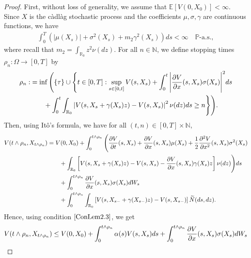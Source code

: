 \documentclass[11pt]{article}
\theoremstyle{theorem}
\theoremstyle{definition}
\newcommand{\bR}{\mathbb{R}}
\newcommand{\1}{{\bf 1}}
\begin{document}
\begin{proof}
 First, without loss of generality, we assume that $\mathbb{E}[V(0, X_0)] < \infty.$ Since $X$ is the c\`adl\`ag stochastic process and the coefficients $\mu, \sigma, \gamma$ are continuous functions, we have
  \begin{align*}
    \int_0^T \left(|\mu (X_s)|+ \sigma^2(X_s) + m_2 \gamma ^2(X_s)\right) ds  < \infty  \quad \mathbb{P} \text{-a.s.},
    \end{align*} 
 where recall that $ m_2= \int_{\bR_0}z^2\nu(d z)$.
For all $n\in \mathbb{N}$, we define stopping times $\rho_n: \Omega \to [0, T]$ by
\begin{align*}
    \rho_n:&= \inf \Bigg(  \{\tau\}\cup \Bigg\{ t\in [0, T]: \sup_{s\in [0, t]} V(s, X_s)+ \int_0^t \Bigg |\dfrac{\partial V}{\partial x}  (s, X_s) \sigma (X_s)\Bigg|^2 ds  \notag \\
    &  \qquad + \int_0^t \int_{\bR_0} \left| V(s, X_{s} + \gamma (X_{s })z ) - V(s, X_{s}) \right|^2 \nu (dz) ds  \geq n \Bigg\} \Bigg).
\end{align*}
Then, using It\^o's formula, we have for all $(t,n) \in [0,T]\times \mathbb{N}$,
\begin{align*}
   V(t\land \rho_n, X_{t\land \rho_n}) 
   & = V(0, X_0) 
   +\int_0^{t\land \rho_n} \Bigg( \dfrac{\partial V}{\partial t}  (s, X_s) +   \dfrac{\partial V}{\partial x}  (s, X_s) \mu (X_s) +  \dfrac{1}{2} \dfrac{\partial^2 V}{\partial x^2}(s, X_s) \sigma^2 (X_s)  \notag \\
   & \qquad +\int_{\bR_0} \left[ V(s, X_s + \gamma (X_{s })z ) - V(s, X_s) - \dfrac{\partial V}{\partial x}(s, X_s) \gamma (X_{s })z \right] \nu (dz)\Bigg) ds\notag \\
   & \qquad + \int_0^{t\land \rho_n}  \dfrac{\partial V}{\partial x}  (s, X_s) \sigma (X_s) dW_s \notag \\
     & \qquad + \int_0^{t\land \rho_n} \int_{\bR_0} \left[ V(s, X_{s-} + \gamma (X_{s- })z ) - V(s, X_{s-})  \right] \widetilde{N}(ds,dz). 
\end{align*}
Hence, using condition $\eqref{ConLem2.3}$, we get  
\begin{align*}
   V(t\land \rho_n, X_{t\land \rho_n}) & \leq V(0, X_0) + \int_0^{t\land \rho_n} \alpha(s)V(s, X_s)ds + \int_0^{t\land \rho_n} \dfrac{\partial V}{\partial x}  (s, X_s) \sigma (X_s) dW_s \notag \\

\end{align*}
\end{proof}
\end{document}
